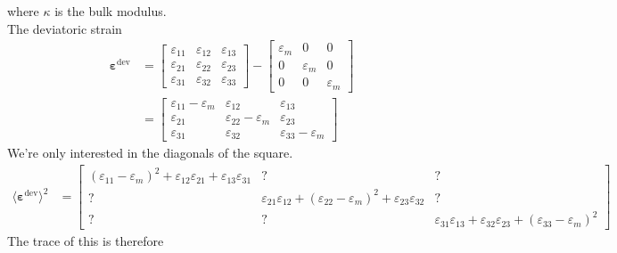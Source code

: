 \documentclass[12pt,3p]{article}
\numberwithin{equation}{section}
\begin{document}
where $\kappa$ is the bulk modulus. \\
The deviatoric strain 
\begin{align*}
\boldsymbol{\varepsilon}^{\mathrm{dev}} &=
\begin{bmatrix}
\varepsilon_{11} & \varepsilon_{12} & \varepsilon_{13} \\
\varepsilon_{21} & \varepsilon_{22} & \varepsilon_{23} \\
\varepsilon_{31} & \varepsilon_{32} & \varepsilon_{33}
\end{bmatrix}
- \begin{bmatrix}
\varepsilon_m& 0 & 0 \\
0 & \varepsilon_m & 0 \\
0 & 0 & \varepsilon_m
\end{bmatrix} \\
&= 
\begin{bmatrix}
\varepsilon_{11} - \varepsilon_m & \varepsilon_{12} & \varepsilon_{13} \\
\varepsilon_{21} & \varepsilon_{22} - \varepsilon_m & \varepsilon_{23} \\
\varepsilon_{31} & \varepsilon_{32} & \varepsilon_{33} - \varepsilon_m
\end{bmatrix}
\end{align*}
We're only interested in the diagonals of the square. 
\begin{align*}
\langle \boldsymbol{\varepsilon}^{\mathrm{dev}} \rangle^2
&= 
\begin{bmatrix}
( \varepsilon_{11} - \varepsilon_m)^2 + \varepsilon_{12} \varepsilon_{21}  + \varepsilon_{13} \varepsilon_{31} & ? & ? \\
? & \varepsilon_{21} \varepsilon_{12}  + ( \varepsilon_{22} - \varepsilon_m)^2 +  \varepsilon_{23} \varepsilon_{32}  &? \\
? & ? & \varepsilon_{31} \varepsilon_{13} + \varepsilon_{32} \varepsilon_{23} + ( \varepsilon_{33} - \varepsilon_m)^2 
\end{bmatrix}
\end{align*}
The trace of this is therefore
\end{document}
